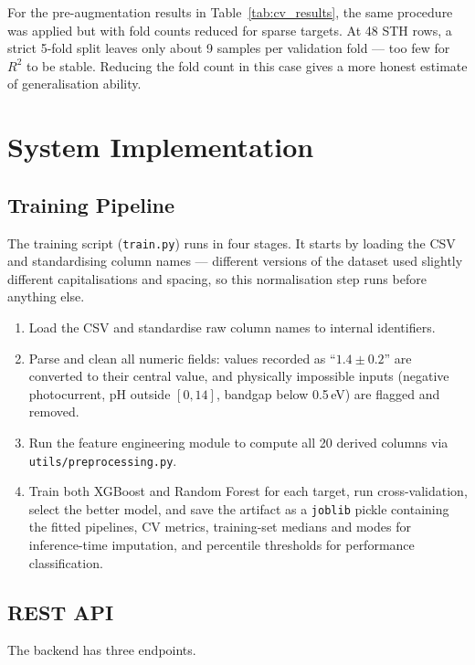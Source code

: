 For the pre-augmentation results in Table~\ref{tab:cv_results}, the same procedure
was applied but with fold counts reduced for sparse targets.
At 48 STH rows, a strict 5-fold split leaves only about 9 samples per validation
fold --- too few for $R^2$ to be stable.
Reducing the fold count in this case gives a more honest estimate of
generalisation ability.

\section{System Implementation}

\subsection{Training Pipeline}

The training script (\texttt{train.py}) runs in four stages.
It starts by loading the CSV and standardising column names --- different versions
of the dataset used slightly different capitalisations and spacing, so this
normalisation step runs before anything else.

\begin{enumerate}
  \item Load the CSV and standardise raw column names to internal identifiers.
  \item Parse and clean all numeric fields: values recorded as
        ``$1.4 \pm 0.2$'' are converted to their central value, and physically
        impossible inputs (negative photocurrent, pH outside $[0,14]$,
        bandgap below 0.5\,eV) are flagged and removed.
  \item Run the feature engineering module to compute all 20 derived columns
        via \texttt{utils/preprocessing.py}.
  \item Train both XGBoost and Random Forest for each target, run
        cross-validation, select the better model, and save the artifact
        as a \texttt{joblib} pickle containing the fitted pipelines,
        CV metrics, training-set medians and modes for inference-time
        imputation, and percentile thresholds for performance classification.
\end{enumerate}

\subsection{REST API}

The backend has three endpoints.

